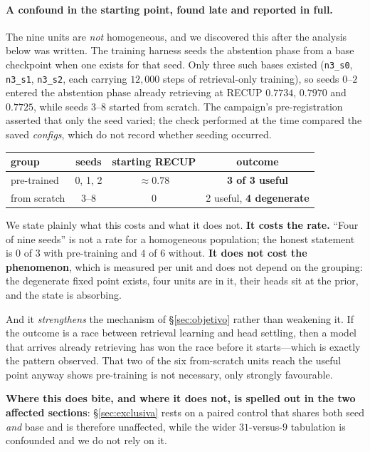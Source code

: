 \documentclass[11pt,a4paper]{article}
\begin{document}
\paragraph{A confound in the starting point, found late and reported in full.} The nine units are
\emph{not} homogeneous, and we discovered this after the analysis below was written. The training
harness seeds the abstention phase from a base checkpoint when one exists for that seed. Only three
such bases existed (\texttt{n3\_s0}, \texttt{n3\_s1}, \texttt{n3\_s2}, each carrying $12{,}000$
steps of retrieval-only training), so seeds $0$--$2$ entered the abstention phase already retrieving
at RECUP $0.7734$, $0.7970$ and $0.7725$, while seeds $3$--$8$ started from scratch. The campaign's
pre-registration asserted that only the seed varied; the check performed at the time compared the
saved \emph{configs}, which do not record whether seeding occurred.

\begin{center}
\begin{tabular}{lccc}
\toprule
group & seeds & starting RECUP & outcome \\
\midrule
pre-trained & 0, 1, 2 & $\approx 0.78$ & \textbf{3 of 3 useful} \\
from scratch & 3--8 & $0$ & 2 useful, \textbf{4 degenerate} \\
\bottomrule
\end{tabular}
\end{center}

We state plainly what this costs and what it does not. \textbf{It costs the rate.} ``Four of nine
seeds'' is not a rate for a homogeneous population; the honest statement is $0$ of $3$ with
pre-training and $4$ of $6$ without. \textbf{It does not cost the phenomenon}, which is measured per
unit and does not depend on the grouping: the degenerate fixed point exists, four units are in it,
their heads sit at the prior, and the state is absorbing.

And it \emph{strengthens} the mechanism of \S\ref{sec:objetivo} rather than weakening it. If the
outcome is a race between retrieval learning and head settling, then a model that arrives already
retrieving has won the race before it starts---which is exactly the pattern observed. That two of the
six from-scratch units reach the useful point anyway shows pre-training is not necessary, only
strongly favourable.

\textbf{Where this does bite, and where it does not, is spelled out in the two affected sections}:
\S\ref{sec:exclusiva} rests on a paired control that shares both seed \emph{and} base and is
therefore unaffected, while the wider $31$-versus-$9$ tabulation is confounded and we do not rely on
it.
\end{document}
